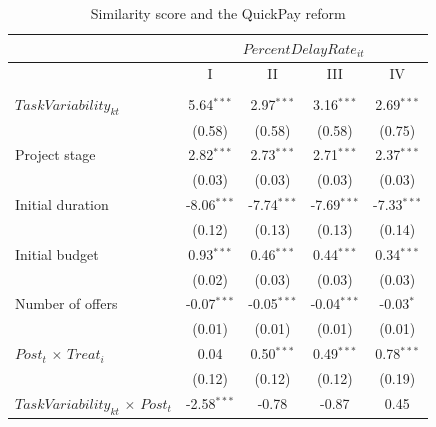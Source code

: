 \documentclass[
]{article}
\begin{document}
\begin{table}[htbp]
   \caption{Similarity score and the QuickPay reform}
   \centering
   \small
   \begin{tabular}{lcccc}
      \toprule
      \midrule  & \multicolumn{4}{c}{$PercentDelayRate_{it}$}\\
      \midrule  & I & II & III & IV\\
      \midrule \\
      $TaskVariability_{kt}$                                        & 5.64$^{***}$  & 2.97$^{***}$  & 3.16$^{***}$  & 2.69$^{***}$\\   
                                                                    & (0.58)        & (0.58)        & (0.58)        & (0.75)\\   
      Project stage                                                 & 2.82$^{***}$  & 2.73$^{***}$  & 2.71$^{***}$  & 2.37$^{***}$\\   
                                                                    & (0.03)        & (0.03)        & (0.03)        & (0.03)\\   
      Initial duration                                              & -8.06$^{***}$ & -7.74$^{***}$ & -7.69$^{***}$ & -7.33$^{***}$\\   
                                                                    & (0.12)        & (0.13)        & (0.13)        & (0.14)\\   
      Initial budget                                                & 0.93$^{***}$  & 0.46$^{***}$  & 0.44$^{***}$  & 0.34$^{***}$\\   
                                                                    & (0.02)        & (0.03)        & (0.03)        & (0.03)\\   
      Number of offers                                              & -0.07$^{***}$ & -0.05$^{***}$ & -0.04$^{***}$ & -0.03$^{*}$\\   
                                                                    & (0.01)        & (0.01)        & (0.01)        & (0.01)\\   
      $Post_t$ $\times$ $Treat_i$                                   & 0.04          & 0.50$^{***}$  & 0.49$^{***}$  & 0.78$^{***}$\\   
                                                                    & (0.12)        & (0.12)        & (0.12)        & (0.19)\\   
      $TaskVariability_{kt}$ $\times$ $Post_t$                      & -2.58$^{***}$ & -0.78         & -0.87         & 0.45\\   

\end{tabular}
\end{table}
\end{document}
